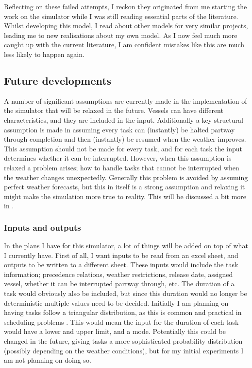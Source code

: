 \documentclass[a4paper,12pt]{article}
\begin{document}
Reflecting on these failed attempts, I reckon they originated from me starting the work on the simulator while I was still reading essential parts of the literature. Whilst developing this model, I read about other models for very similar projects, leading me to new realisations about my own model. As I now feel much more caught up with the current literature, I am confident mistakes like this are much less likely to happen again. 

\subsection{Future developments} \label{ss:simfut}
A number of significant assumptions are currently made in the implementation of the simulator that will be relaxed in the future. Vessels can have different characteristics, and they are included in the input. Additionally a key structural assumption is made in assuming every task can (instantly) be halted partway through completion and then (instantly) be resumed when the weather improves. This assumption should not be made for every task, and for each task the input determines whether it can be interrupted. However, when this assumption is relaxed a problem arises; how to handle tasks that cannot be interrupted when the weather changes unexpectedly. Generally this problem is avoided by assuming perfect weather forecasts, but this in itself is a strong assumption and relaxing it might make the simulation more true to reality. This will be discussed a bit more in . 

\subsubsection{Inputs and outputs} \label{sss:inou}
In the plans I have for this simulator, a lot of things will be added on top of what I currently have. First of all, I want inputs to be read from an excel sheet, and outputs to be written to a different sheet. These inputs would include the task information; precedence relations, weather restrictions, release date, assigned vessel, whether it can be interrupted partway through, etc.  The duration of a task would obviously also be included, but since this duration would no longer be deterministic multiple values need to be decided. Initially I am planning on having tasks follow a triangular distribution, as this is common and practical in scheduling problems \cite{williams1992practical}. This would mean the input for the duration of each task would have a lower and upper limit, and a mode. Potentially this could be changed in the future, giving tasks a more sophisticated probability distribution (possibly depending on the weather conditions), but for my initial experiments I am not planning on doing so.
\end{document}
